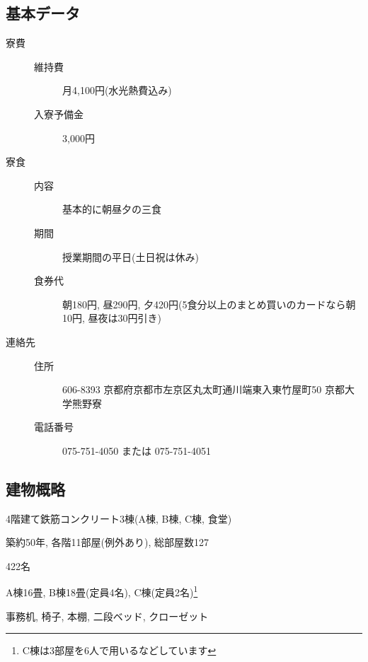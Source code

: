 \documentclass[10pt,b5jsbook,dvips,dvipdfmx,openany]{jsbook}
\theoremstyle{definition}
\begin{document}
		\subsection{基本データ} \label{subsec:data}
		\begin{description} %
		\item[寮費] \hspace{10mm}
			\begin{description}
			\item[維持費] 月4,100円(水光熱費込み)
			\item[入寮予備金] 3,000円
			\end{description}
		\item[寮食] \hspace{10mm} %
			\begin{description}
			\item[内容] 基本的に朝昼夕の三食
			\item[期間] 授業期間の平日(土日祝は休み)
			\item[食券代] 朝180円, 昼290円, 夕420円(5食分以上のまとめ買いのカードなら朝10円, 昼夜は30円引き)
			\end{description}
		\item[連絡先] \hspace{10mm} %
			\begin{description}
			\item[住所]606-8393 京都府京都市左京区丸太町通川端東入東竹屋町50 京都大学熊野寮
			\item[電話番号] 075-751-4050 または 075-751-4051
			\end{description}
		\end{description}

		\subsection{建物概略}
		\begin{description}
		\item 4階建て鉄筋コンクリート3棟(A棟, B棟, C棟, 食堂)
		\item 築約50年, 各階11部屋(例外あり), 総部屋数127
		\item[定員] 422名
		\item[居室] A棟16畳,  B棟18畳(定員4名), C棟(定員2名)\footnote{C棟は3部屋を6人で用いるなどしています}
		\item[備品] 事務机, 椅子, 本棚, 二段ベッド, クローゼット
		\end{description}
\end{document}
